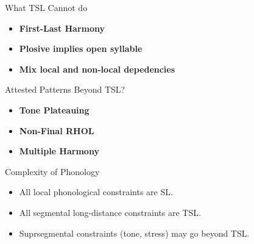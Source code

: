 \documentclass[xcolor={usenames,svgnames,x11names,table}]{beamer}
\begin{document}
\begin{frame}{What TSL Cannot do}
    \begin{itemize}
        \item \textbf{First-Last Harmony}\\
        \item \textbf{Plosive implies open syllable}\\
        \item \textbf{Mix local and non-local depedencies}\\
    \end{itemize}
    \pause
    \begin{block}{Attested Patterns Beyond TSL?}
        \begin{itemize}
            \item \textbf{Tone Plateauing} 
            \item \textbf{Non-Final RHOL} \\
            \item \textbf{Multiple Harmony} \\
        \end{itemize}
    \end{block}
\end{frame}


\begin{frame}{Complexity of Phonology}
    \begin{itemize}
        \item All local phonological constraints are SL\@.
        \item All segmental long-distance constraints are TSL\@.\\
        \item Suprsegmental constraints (tone, stress) may go beyond TSL\@.\\
    \end{itemize}
\end{frame}
\end{document}
